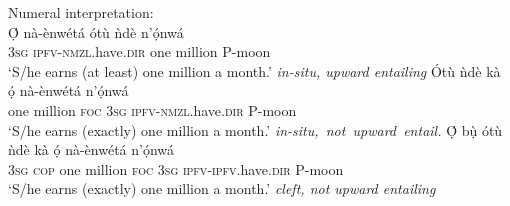 \documentclass[output=paper,colorlinks,citecolor=brown]{langscibook}
\begin{document}
\ea%
    \label{ex:amaechi:10}
    Numeral interpretation:\\
    \ea\label{ex:amaechi:10a}
    \gll    \d{\'O} n\`a-\`enw\'et\'a \'ot\`u \`nd\`e n'\d{\'o}nw\'a\\
            3\textsc{sg} \textsc{ipfv}-\textsc{nmzl}.have.\textsc{dir} one million P-moon\\
    \glt    `S/he earns (at least) one million a month.' \hfill\textit{in-situ, upward entailing}
    \ex\label{ex:amaechi:10b}
    \gll    \'Ot\`u \`nd\`e k\`a \d{\'o} n\`a-\`enw\'et\'a n'\d{\'o}nw\'a\\
            one million \textsc{foc} 3\textsc{sg} \textsc{ipfv}-\textsc{nmzl}.have.\textsc{dir} P-moon\\
    \glt    `S/he earns (exactly) one million a month.' \hfill\textit{in-situ,~not~upward~entail.}
    \ex\label{ex:amaechi:10c}
    \gll    \d{\'O} b\d{\`u} \'ot\`u \`nd\`e k\`a \d{\'o} n\`a-\`enw\'et\'a n'\d{\'o}nw\'a\\
            3\textsc{sg} \textsc{cop} one million \textsc{foc} 3\textsc{sg} \textsc{ipfv}-\textsc{ipfv}.have.\textsc{dir} P-moon\\
    \glt    `S/he earns (exactly) one million a month.' \hfill\textit{cleft, not upward entailing}
    \z
\z


\end{document}
